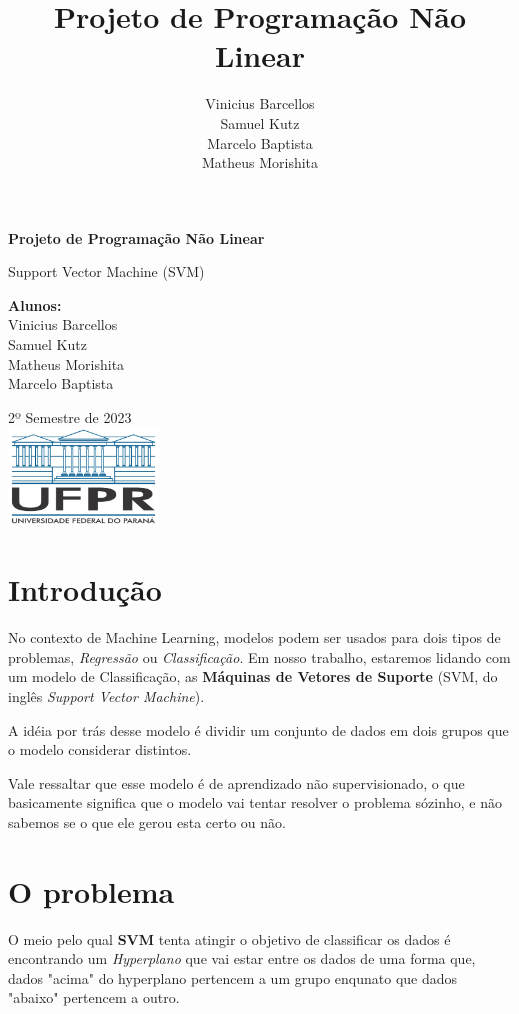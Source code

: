 \documentclass{article}
\title{Projeto de Programação Não Linear}
\author{Vinicius Barcellos\\Samuel Kutz \\Marcelo Baptista \\Matheus Morishita}
\date{}
\begin{document}
\begin{titlepage}
    \begin{center}
        \vspace*{1cm}
            
        \Huge
        \textbf{Projeto de Programação Não Linear}
            
        \vspace{0.5cm}
        \LARGE
        Support Vector Machine (SVM)
            
        \vspace{0.8cm}
        \textbf{Alunos:}\\
        Vinicius Barcellos\\Samuel Kutz\\Matheus Morishita\\Marcelo Baptista
            
        \vfill
        2º Semestre de 2023\\ 
        \vfill
        \includegraphics[width=0.3\textwidth]{ufpr_1000.jpg}
            
            
    \end{center}
\end{titlepage}

\section{Introdução}
No contexto de Machine Learning, modelos podem ser usados para dois tipos de problemas, \textit{Regressão} ou \textit{Classificação}. Em nosso trabalho, estaremos lidando com um modelo de Classificação, as \textbf{Máquinas de Vetores de Suporte} (SVM, do inglês \textit{Support Vector Machine}).

A idéia por trás desse modelo é dividir um conjunto de dados em dois grupos que o modelo considerar distintos. 

Vale ressaltar que esse modelo é de aprendizado não supervisionado, o que basicamente significa que o modelo vai tentar resolver o problema sózinho, e não sabemos se o que ele gerou esta certo ou não.


\section{O problema}
O meio pelo qual \textbf{SVM} tenta atingir o objetivo de classificar os dados é encontrando um \textit{Hyperplano} que vai estar entre os dados de uma forma que, dados "acima" do hyperplano pertencem a um grupo enqunato que dados "abaixo" pertencem a outro.
\end{document}
